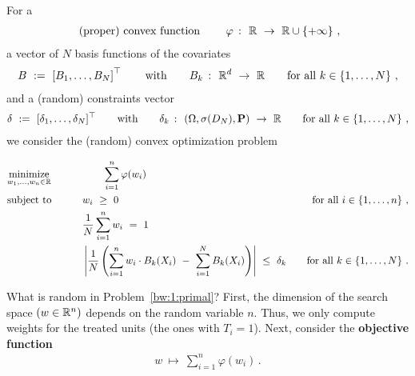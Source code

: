 For a 
\begin{align*}
  \text{
(proper) convex function
  }
  \qquad
  \varphi\ \colon\  \mathbb{R}\ \to\ \mathbb{R}\cup \left\{ +\infty \right\}
  \,,
\end{align*}
a vector of $N$ basis functions of the covariates 
\begin{gather*}
  B
  \ 
  :=
  \ 
  \left[ 
    B_1,\ldots,B_N
  \right]^\top
  \qquad
  \text{with}\qquad 
  B_k\ \colon\  \R^d\ \to\ \R
  \qquad
  \text{for all}\ k\in \left\{ 1,\ldots,N \right\}
  \,,
\end{gather*}
and a (random) constraints vector
\begin{align*}
\delta\ :=\ [\delta_1,\ldots,\delta_N]^\top
\qquad
  \text{with}\qquad 
  \delta_k\ \colon\  (\Omega,\sigma(D_N),\mathbf{P})\ \to\ \mathbb{R}
  \qquad
  \text{for all}\ k\in \left\{ 1,\ldots,N \right\}
  \,,
\end{align*}
we consider the (random) convex optimization problem
\begin{fproblem}
  \label{bw:1:primal}
\begin{align*}
    &\underset{w_1, \ldots, w_n \in \R}
    {\text{minimize}}
    &&\qquad\qquad
    \sum_{i = 1}^{n} 
    \varphi(w_i)
    &&&
    \\
    &\text{subject to}
    &&\qquad
    w_i 
    \ 
    \ge
    \ 
    0
    &&&
    \text{for all}\ 
    i \in \left\{ 1, \ldots, n \right\}
    \,,
    \\
    & 
    &&
    \qquad
    \frac{1}{N}
    \sum_{i=1}^{n} 
    w_i
    \ 
    =
    \ 
    1
    \\
    & 
    &&\qquad
    \left| 
      \frac{1}{N} 
      \left( 
      \sum_{i = 1}^{n} 
      w_i
      \cdot
      B_k(X_i)
      \ 
      -
      \ 
      \sum_{i=1}^{N} 
      B_k(X_i)
      \right)
    \right|
    \ 
    \le 
    \ 
    \delta_k
    &&&
    \text{for all}\ 
    k \in \left\{ 1, \ldots, N \right\}
    \,.
\end{align*}
\end{fproblem}
What is random in Problem~\ref{bw:1:primal}?
First, the dimension of the search space $(w\in\mathbb{R}^n)$ depends on the random variable $n$. 
Thus, we only compute weights for the treated units (the ones with $T_i=1$).
Next, consider the \textbf{objective function}
\begin{gather*}
  w
  \ 
  \mapsto
  \ 
    \sum_{i = 1}^{n} 
    \varphi(w_i)
    \,.
\end{gather*}
